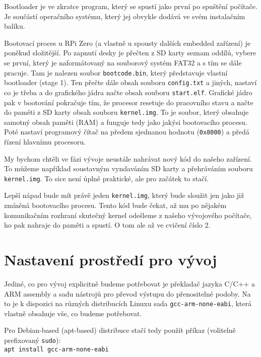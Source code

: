 \documentclass{article}
\begin{document}
Bootloader je ve zkratce program, který se spustí jako první po spuštění počítače. Je součástí operačního systému, který jej obvykle dodává ve svém instalačním balíku.

Bootovací proces u RPi Zero (a vlastně u spousty dalších embedded zařízení) je poněkud složitější. Po zapnutí desky je přečten z SD karty seznam oddílů, vybere se první, který je naformátovaný na souborový systém FAT32 a s tím se dále pracuje. Tam je nalezen soubor \texttt{bootcode.bin}, který představuje vlastní bootloader (stage 1). Ten přečte dále obsah souboru \texttt{config.txt} a jiných, nastaví co je třeba a do grafického jádra načte obsah souboru \texttt{start.elf}. Grafické jádro pak v bootování pokračuje tím, že procesor resetuje do pracovního stavu a načte do paměti z SD karty obsah souboru \texttt{kernel.img}. To je soubor, který obsahuje samotný obsah paměti (RAM) a funguje tedy jako jakýsi  bootovacího procesu. Poté nastaví programový čítač na předem sjednanou hodnotu (\texttt{0x8000}) a předá řízení hlavnímu procesoru.

My bychom chtěli ve fázi vývoje neustále nahrávat nový kód do našeho zařízení. To můžeme například soustavným vyndaváním SD karty a přehráváním souboru \texttt{kernel.img}. To sice není úplně praktické, ale pro začátek to stačí.

Lepší nápad bude mít právě jeden \texttt{kernel.img}, který bude sloužit jen jako již zmíněná  bootovacího procesu. Tento kód bude čekat, až mu po nějakém komunikačním rozhraní skutečný kernel odešleme z našeho vývojového počítače,  ho pak nahraje do paměti a spustí. O tom ale až ve cvičení číslo 2.

\section{Nastavení prostředí pro vývoj}

Jediné, co pro vývoj explicitně budeme potřebovat je překladač jazyka C/C++ a ARM assembly a sadu nástrojů pro převod výstupu do přenositelné podoby. Na to je k dispozici na různých distribucích Linuxu sada \texttt{gcc-arm-none-eabi}, která vlastně obsahuje vše, co budeme potřebovat.

Pro Debian-based (apt-based) distribuce stačí tedy použít příkaz (volitelně prefixovaný \texttt{sudo}):\\

\texttt{apt install gcc-arm-none-eabi}\\
\end{document}
